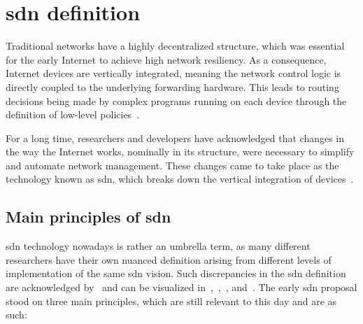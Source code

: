 \section[SDN definition]{\gls{sdn} definition}

Traditional networks have a highly decentralized structure, which was essential for the early Internet to achieve high network resiliency. As a consequence, Internet devices are vertically integrated, meaning the network control logic is directly coupled to the underlying forwarding hardware. This leads to routing decisions being made by complex programs running on each device through the definition of low-level policies~\cite{bifulco_survey_2018}. 

For a long time, researchers and developers have acknowledged that changes in the way the Internet works, nominally in its structure, were necessary to simplify and automate network management\cite{peterson_software-defined_2021}. These changes came to take place as the technology known as \gls{sdn}, which breaks down the vertical integration of devices~\cite{thyagaturu_software_2016}.  

\subsection[Main principles of SDN]{Main principles of \gls{sdn}}
\gls{sdn} technology nowadays is rather an umbrella term, as many different researchers have their own nuanced definition arising from different levels of implementation of the same \gls{sdn} vision. Such discrepancies in the \gls{sdn} definition are acknowledged by~\cite{peterson_software-defined_2021} and can be visualized in~\cite{feamster_road_2013},~\cite{thyagaturu_software_2016},~\cite{nunes_survey_2014}, and~\cite{bifulco_survey_2018}.
The early \gls{sdn} proposal stood on three main principles, which are still relevant to this day and are as such:

